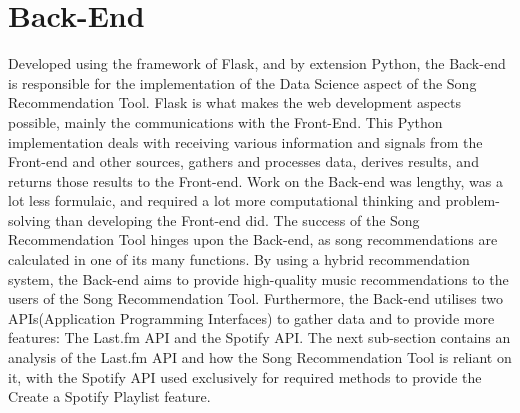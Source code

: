 \documentclass{l4proj}
\begin{document}
\section{Back-End}
Developed using the framework of Flask, and by extension Python, the Back-end is responsible for the implementation of the Data Science aspect of the Song Recommendation Tool. Flask is what makes the web development aspects possible, mainly the communications with the Front-End. This Python implementation deals with receiving various information and signals from the Front-end and other sources, gathers and processes data, derives results, and returns those results to the Front-end. Work on the Back-end was lengthy, was a lot less formulaic, and required a lot more computational thinking and problem-solving than developing the Front-end did. The success of the Song Recommendation Tool hinges upon the Back-end, as song recommendations are calculated in one of its many functions. By using a hybrid recommendation system, the Back-end aims to provide high-quality music recommendations to the users of the Song Recommendation Tool. Furthermore, the Back-end utilises two APIs(Application Programming Interfaces) to gather data and to provide more features: The Last.fm API and the Spotify API. The next sub-section contains an analysis of the Last.fm API and how the Song Recommendation Tool is reliant on it, with the Spotify API used exclusively for required methods to provide the Create a Spotify Playlist feature.
\end{document}
